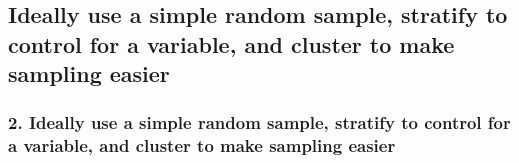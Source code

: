 \documentclass[11pt,containsverbatim,handout,xcolor=xelatex,dvipsnames,table]{beamer}
\begin{document}

\subsection{Ideally use a simple random sample, stratify to control for a variable, and cluster to make sampling easier} 
\label{mi2}


\begin{frame}
\frametitle{2. Ideally use a simple random sample, stratify to control for a variable, 
and cluster to make sampling easier}

\pause

\end{frame}
\end{document}
